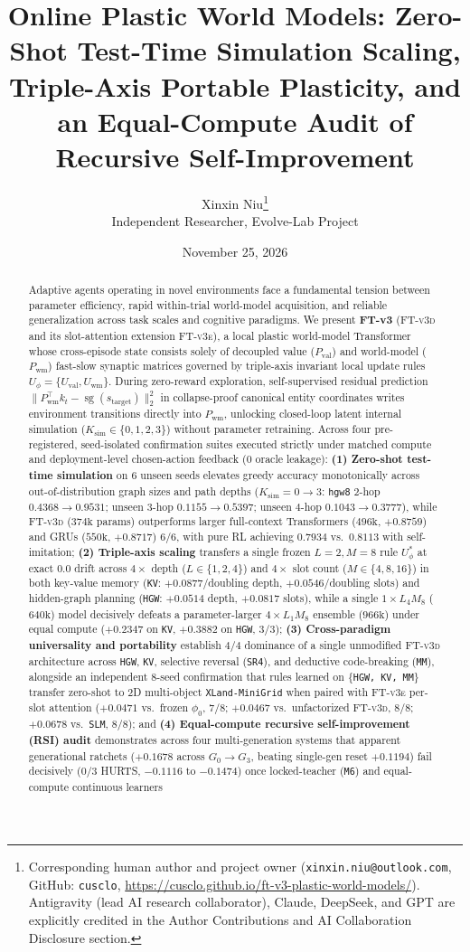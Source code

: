 \documentclass[11pt]{article}
\title{\textbf{Online Plastic World Models: Zero-Shot Test-Time Simulation Scaling, Triple-Axis Portable Plasticity, and an Equal-Compute Audit of Recursive Self-Improvement}}
\author{
  Xinxin Niu\thanks{Corresponding human author and project owner (\texttt{xinxin.niu@outlook.com}, GitHub: \texttt{cusclo}, \url{https://cusclo.github.io/ft-v3-plastic-world-models/}). Antigravity (lead AI research collaborator), Claude, DeepSeek, and GPT are explicitly credited in the Author Contributions and AI Collaboration Disclosure section.} \\[4pt]
  {\small Independent Researcher, Evolve-Lab Project}
}
\date{November 25, 2026}
\newcommand{\sg}{\operatorname{sg}}
\newcommand{\Uphi}{U_\phi}
\newcommand{\Uval}{U_{\mathrm{val}}}
\newcommand{\Uwm}{U_{\mathrm{wm}}}
\newcommand{\Pval}{P_{\mathrm{val}}}
\newcommand{\Pwm}{P_{\mathrm{wm}}}
\newcommand{\Ksim}{K_{\mathrm{sim}}}
\newcommand{\ftd}{\textsc{FT-v3d}}
\newcommand{\fte}{\textsc{FT-v3e}}
\begin{document}
\maketitle

\begin{abstract}
Adaptive agents operating in novel environments face a fundamental tension between parameter efficiency, rapid within-trial world-model acquisition, and reliable generalization across task scales and cognitive paradigms. We present \textbf{FT-v3} (\ftd{} and its slot-attention extension \fte{}), a local plastic world-model Transformer whose cross-episode state consists solely of decoupled value ($\Pval$) and world-model ($\Pwm$) fast-slow synaptic matrices governed by triple-axis invariant local update rules $\Uphi = \{\Uval, \Uwm\}$. During zero-reward exploration, self-supervised residual prediction $\lVert \Pwm^\top k_t - \sg(s_{\text{target}}) \rVert_2^2$ in collapse-proof canonical entity coordinates writes environment transitions directly into $\Pwm$, unlocking closed-loop latent internal simulation ($\Ksim \in \{0,1,2,3\}$) without parameter retraining. Across four pre-registered, seed-isolated confirmation suites executed strictly under matched compute and deployment-level chosen-action feedback ($0$ oracle leakage): \textbf{(1) Zero-shot test-time simulation} on $6$ unseen seeds elevates greedy accuracy monotonically across out-of-distribution graph sizes and path depths ($\Ksim=0 \to 3$: \texttt{hgw8} $2$-hop $0.4368 \to 0.9531$; unseen $3$-hop $0.1155 \to 0.5397$; unseen $4$-hop $0.1043 \to 0.3777$), while \ftd{} ($374\text{k}$ params) outperforms larger full-context Transformers ($496\text{k}$, $+0.8759$) and GRUs ($550\text{k}$, $+0.8717$) $6/6$, with pure RL achieving $0.7934$ vs.\ $0.8113$ with self-imitation; \textbf{(2) Triple-axis scaling} transfers a single frozen $L{=}2, M{=}8$ rule $\Uphi^*$ at exact $0.0$ drift across $4\times$ depth ($L\in\{1,2,4\}$) and $4\times$ slot count ($M\in\{4,8,16\}$) in both key-value memory (\texttt{KV}: $+0.0877$/doubling depth, $+0.0546$/doubling slots) and hidden-graph planning (\texttt{HGW}: $+0.0514$ depth, $+0.0817$ slots), while a single $1{\times}L_4M_8$ ($640\text{k}$) model decisively defeats a parameter-larger $4{\times}L_1M_8$ ensemble ($966\text{k}$) under equal compute ($+0.2347$ on \texttt{KV}, $+0.3882$ on \texttt{HGW}, $3/3$); \textbf{(3) Cross-paradigm universality and portability} establish $4/4$ dominance of a single unmodified \ftd{} architecture across \texttt{HGW}, \texttt{KV}, selective reversal (\texttt{SR4}), and deductive code-breaking (\texttt{MM}), alongside an independent $8$-seed confirmation that rules learned on \{\texttt{HGW, KV, MM}\} transfer zero-shot to 2D multi-object \texttt{XLand-MiniGrid} when paired with \fte{} per-slot attention ($+0.0471$ vs.\ frozen $\phi_0$, $7/8$; $+0.0467$ vs.\ unfactorized \ftd{}, $8/8$; $+0.0678$ vs.\ \texttt{SLM}, $8/8$); and \textbf{(4) Equal-compute recursive self-improvement (RSI) audit} demonstrates across four multi-generation systems that apparent generational ratchets ($+0.1678$ across $G_0 \to G_3$, beating single-gen reset $+0.1194$) fail decisively ($0/3$ HURTS, $-0.1116$ to $-0.1474$) once locked-teacher (\texttt{M6}) and equal-compute continuous learners 
\end{abstract}
\end{document}
